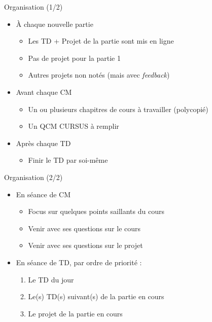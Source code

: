 \documentclass[10pt]{beamer}
\begin{document}
\begin{frame}{Organisation (1/2)}  
  \begin{itemize}
    \item À chaque nouvelle partie
    \begin{itemize}
      \item Les TD + Projet de la partie sont mis en ligne
      \item Pas de projet pour la partie 1
      \item Autres projets non notés (mais avec \emph{feedback})
    \end{itemize}
    \item Avant chaque CM
    \begin{itemize}
      \item Un ou plusieurs chapitres de cours à travailler (polycopié)
      \item Un QCM CURSUS à remplir
    \end{itemize}
    \item Après chaque TD
    \begin{itemize}
      \item Finir le TD par soi-même
    \end{itemize}
  \end{itemize}
\end{frame}

\begin{frame}{Organisation (2/2)}  
  \begin{itemize}
    \item En séance de CM
    \begin{itemize}
      \item Focus sur quelques points saillants du cours
      \item Venir avec ses questions sur le cours
      \item Venir avec ses questions sur le projet
    \end{itemize}
    \item En séance de TD, par ordre de priorité :
    \begin{enumerate}
      \item Le TD du jour
      \item Le(s) TD(s) suivant(s) de la partie en cours
      \item Le projet de la partie en cours
    \end{enumerate}
  \end{itemize}
\end{frame}
\end{document}
